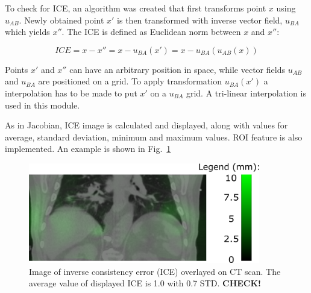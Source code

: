 \documentclass[type=dr, dr=rernat, accentcolor=tud7b,colorbacktitle, bigchapter, openright, twoside, 12pt ]{tudthesis}
\begin{document}
To check for ICE, an algorithm was created that first transforms point $x$ using $u_{AB}$. Newly obtained point $x'$ is then transformed with inverse vector
field, $u_{BA}$ which yields $x''$. The ICE is defined as Euclidean norm between $x$ and $x''$:

\begin{equation}
\label{eq:ice}
ICE = x - x'' = x - u_{BA}(x') = x - u_{BA}(u_{AB}(x))
\end{equation}

Points $x'$ and $x''$ can have an arbitrary position in space, while vector fields $u_{AB}$ and $u_{BA}$ are positioned on a grid. To apply transformation $u_{BA}(x')$ a interpolation has to be made to put $x'$ on a $u_{BA}$ grid. A tri-linear interpolation is used in this module.

As in Jacobian, ICE image is calculated and displayed, along with values for average, standard deviation, minimum and maximum values. ROI feature is also implemented. An example is shown in Fig.~\ref{inv}

\begin{figure}[H]
\begin{center}
\includegraphics[width=0.9\textwidth]{./Images/inv.png}
\caption{Image of inverse consistency error (ICE) overlayed on CT scan. The average value of displayed ICE is 1.0 with 0.7 STD. \textbf{CHECK!}}
\label{inv}
\end{center}
\end{figure}


% 
\end{document}

